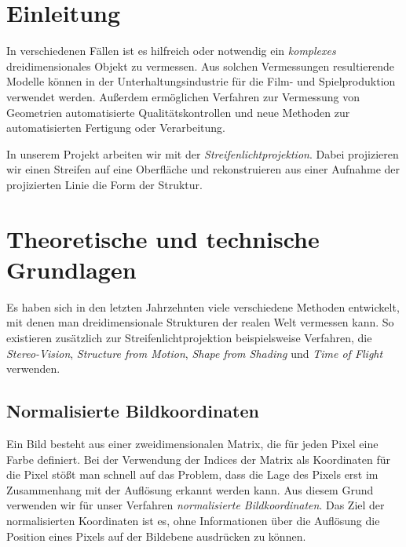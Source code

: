 \documentclass[ngerman,a4paper,parskip=half]{scrartcl}
\begin{document}


\tableofcontents
\newpage


\section{Einleitung}

In verschiedenen Fällen ist es hilfreich oder notwendig ein \emph{komplexes} dreidimensionales Objekt zu vermessen. Aus solchen Vermessungen resultierende Modelle können in der Unterhaltungsindustrie für die Film- und Spielproduktion verwendet werden. Außerdem ermöglichen Verfahren zur Vermessung von Geometrien automatisierte Qualitätskontrollen und neue Methoden zur automatisierten Fertigung oder Verarbeitung.

In unserem Projekt arbeiten wir mit der \emph{Streifenlichtprojektion}. Dabei projizieren wir einen Streifen auf eine Oberfläche und rekonstruieren aus einer Aufnahme der projizierten Linie die Form der Struktur.


\section{Theoretische und technische Grundlagen}

Es haben sich in den letzten Jahrzehnten viele verschiedene Methoden entwickelt, mit denen man dreidimensionale Strukturen der realen Welt vermessen kann. So existieren zusätzlich zur Streifenlichtprojektion beispielsweise Verfahren, die \emph{Stereo-Vision}, \emph{Structure from Motion}, \emph{Shape from Shading} und \emph{Time of Flight} verwenden.

\subsection{Normalisierte Bildkoordinaten}
\label{sec:imagecoordinates}

Ein Bild besteht aus einer zweidimensionalen Matrix, die für jeden Pixel eine Farbe definiert. Bei der Verwendung der Indices der Matrix als Koordinaten für die Pixel stößt man schnell auf das Problem, dass die Lage des Pixels erst im Zusammenhang mit der Auflösung erkannt werden kann. Aus diesem Grund verwenden wir für unser Verfahren \emph{normalisierte Bildkoordinaten}. Das Ziel der normalisierten Koordinaten ist es, ohne Informationen über die Auflösung die Position eines Pixels auf der Bildebene ausdrücken zu können.
\end{document}
